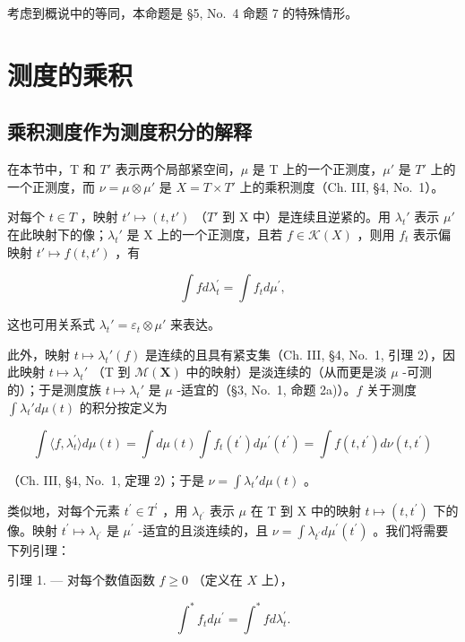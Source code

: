 考虑到概说中的等同，本命题是 §5, No.~4 命题 7 的特殊情形。

\section{测度的乘积}

\subsection{乘积测度作为测度积分的解释}

在本节中，T 和 \(T'\) 表示两个局部紧空间，\(\mu\) 是 T 上的一个正测度，\(\mu'\) 是 \(T'\) 上的一个正测度，而 \(\nu = \mu \otimes \mu'\) 是 \(X = T \times T'\) 上的乘积测度（Ch. III, §4, No.~1）。

对每个 \(t \in T\) ，映射 \(t' \mapsto (t, t')\) （\(T'\) 到 X 中）是连续且逆紧的。用 \(\lambda_t'\) 表示 \(\mu'\) 在此映射下的像；\(\lambda_t'\) 是 X 上的一个正测度，且若 \(f \in \mathcal{K}(X)\) ，则用 \(f_t\) 表示偏映射 \(t' \mapsto f(t, t')\) ，有

\[
\int f d \lambda_ {t} ^ {\prime} = \int f _ {t} d \mu^ {\prime},\tag{1}
\]

这也可用关系式 \(\lambda_t' = \varepsilon_t \otimes \mu'\) 来表达。

此外，映射 \(t \mapsto \lambda_t'(f)\) 是连续的且具有紧支集（Ch. III, §4, No.~1, 引理 2），因此映射 \(t \mapsto \lambda_t'\) （T 到 \(\mathcal{M}(\mathbf{X})\) 中的映射）是淡连续的（从而更是淡 \(\mu\) -可测的）；于是测度族 \(t \mapsto \lambda_t'\) 是 \(\mu\) -适宜的（§3, No.~1, 命题 2a)）。\(f\) 关于测度 \(\int \lambda_t' d\mu(t)\) 的积分按定义为

\[
\int \langle f, \lambda_ {t} ^ {\prime} \rangle d \mu (t) = \int d \mu (t) \int f _ {t} (t ^ {\prime}) d \mu^ {\prime} (t ^ {\prime}) = \int f (t, t ^ {\prime}) d \nu (t, t ^ {\prime})
\]

（Ch. III, §4, No.~1, 定理 2）；于是 \(\nu = \int \lambda_t' d\mu(t)\) 。

类似地，对每个元素 \(t^{\prime} \in T^{\prime}\) ，用 \(\lambda_{t^{\prime}}\) 表示 \(\mu\) 在 T 到 X 中的映射 \(t \mapsto (t, t^{\prime})\) 下的像。映射 \(t^{\prime} \mapsto \lambda_{t^{\prime}}\) 是 \(\mu^{\prime}\) -适宜的且淡连续的，且 \(\nu = \int \lambda_{t^{\prime}} d\mu^{\prime}(t^{\prime})\) 。我们将需要下列引理：

引理 1. --- 对每个数值函数 \(f \geqslant 0\) （定义在 \(X\) 上），

\[
\int^ {*} f _ {t} d \mu^ {\prime} = \int^ {*} f d \lambda_ {t} ^ {\prime}.\tag{2}
\]

